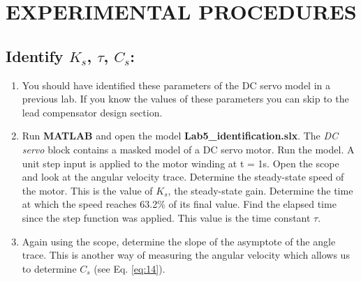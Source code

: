 \documentclass[11pt,a4paper]{article}
\begin{document}


\section{EXPERIMENTAL PROCEDURES}
\subsection{Identify $K_{s}$, $\tau$, $C_{s}$:}
\begin{enumerate}
\item You should have identified these parameters of the DC servo model in a previous lab. If you know the values of these parameters you can skip to the lead compensator design section.

\item Run \textbf{MATLAB} and open the model \textbf{Lab5\_identification.slx}. The \textit{DC servo} block contains a masked model of a DC servo motor. Run the model. A unit step input is applied to the motor winding at t = 1s. Open the scope and look at the angular velocity trace. Determine the steady-state speed of the motor. This is the value of $K_{s}$, the steady-state gain. Determine the time at which the speed reaches 63.2\% of its final value. Find the elapsed time since the step function was applied. This value is the time constant $\tau$.

\item Again using the scope, determine the slope of the asymptote of the angle trace. This is another way of measuring the angular velocity which allows us to determine $C_{s}$ (see Eq. \ref{eq:14}). 
\end{enumerate}
\end{document}
